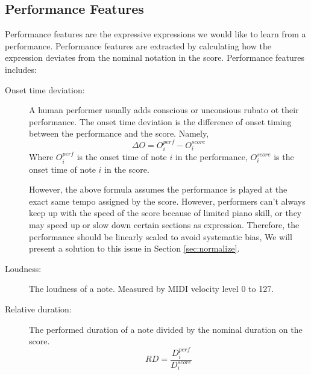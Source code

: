


\subsection{Performance Features}
   Performance features are the expressive expressions we would like to learn from a performance. Performance features are extracted by calculating how the expression deviates from the nominal notation in the score.
      Performance features includes:
      \begin{description}
         \item [Onset time deviation:] 
            A human performer usually adds conscious or unconsious rubato ot their performance. The onset time deviation is the difference of onset timing between the performance and the score. Namely,
            $$ \Delta O = O_i^{perf} - O_i^{score} $$ Where $O_i^{perf}$ is the onset time of note $i$ in the performance, $O_i^{score}$ is the onset time of note $i$ in the score. 

            However, the above formula assumes the performance is played at the exact same tempo assigned by the score. However, performers can't always keep up with the speed of the score because of limited piano skill, or they may speed up or slow down certain sections as expression. Therefore, the performance should be linearly scaled to avoid systematic bias, We will present a solution to this issue in Section \ref{sec:normalize}.
         \item [Loudness:] The loudness of a note. Measured by MIDI velocity level 0 to 127.

         \item [Relative duration:]
            The performed duration of a note divided by the nominal duration on the score.
            $$ RD = \frac{ D_i^{perf}}{D_i^{score}}$$
      \end{description}

